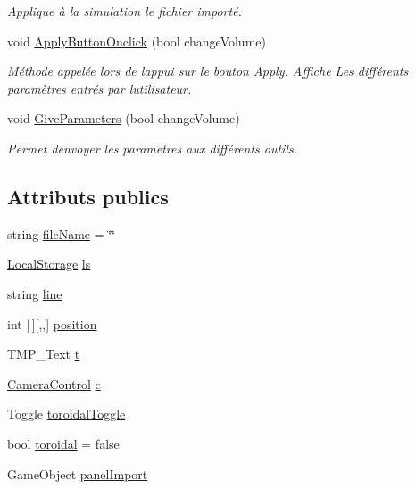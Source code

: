 \begin{DoxyCompactItemize}
\begin{DoxyCompactList}\small\item\em Applique à la simulation le fichier importé. \end{DoxyCompactList}\item 
void \mbox{\hyperlink{class_parameters_a8702daf046aa4d1c44a284c78f6ff058}{Apply\+Button\+Onclick}} (bool change\+Volume)
\begin{DoxyCompactList}\small\item\em Méthode appelée lors de l\textquotesingle{}appui sur le bouton Apply. Affiche Les différents paramètres entrés par l\textquotesingle{}utilisateur. \end{DoxyCompactList}\item 
void \mbox{\hyperlink{class_parameters_abc57bdbb6a4e2f78c7d71f1fa26b5fe8}{Give\+Parameters}} (bool change\+Volume)
\begin{DoxyCompactList}\small\item\em Permet d\textquotesingle{}envoyer les parametres aux différents outils. \end{DoxyCompactList}\end{DoxyCompactItemize}
\subsection*{Attributs publics}
\begin{DoxyCompactItemize}
\item 
string \mbox{\hyperlink{class_parameters_abbfa8fa8cae3b3c7db55b2c23ec747d5}{file\+Name}} = \char`\"{}\char`\"{}
\item 
\mbox{\hyperlink{class_local_storage}{Local\+Storage}} \mbox{\hyperlink{class_parameters_ab63c98cfc7508243010978c7c4d515a5}{ls}}
\item 
string \mbox{\hyperlink{class_parameters_a978bf381c1fd3f17e4289f182b7d647b}{line}}
\item 
int \mbox{[}$\,$\mbox{]}\mbox{[},,\mbox{]} \mbox{\hyperlink{class_parameters_ad01c1db17d90b97c666abf21a9c6fcd1}{position}}
\item 
T\+M\+P\+\_\+\+Text \mbox{\hyperlink{class_parameters_ab34fbc511ef46943e88471495d3b37c0}{t}}
\item 
\mbox{\hyperlink{class_camera_control}{Camera\+Control}} \mbox{\hyperlink{class_parameters_aac3a7af7ad68f30d87e89debcb137c1f}{c}}
\item 
Toggle \mbox{\hyperlink{class_parameters_a3cf74feb1b6bd8cc24bc3ef0e78e15fb}{toroidal\+Toggle}}
\item 
bool \mbox{\hyperlink{class_parameters_a8aec5ef7f7bdb0497b9de3ddce353c88}{toroidal}} = false
\item 
Game\+Object \mbox{\hyperlink{class_parameters_a9039782e9b57b1cca98f109c8bd22928}{panel\+Import}}
\end{DoxyCompactItemize}
